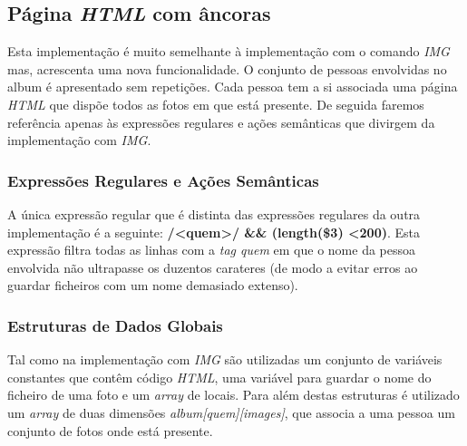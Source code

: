 \documentclass{article}
\begin{document}
\subsection{Página \emph{HTML} com âncoras}
Esta implementação é muito semelhante à implementação com o comando \emph{IMG} mas, acrescenta uma nova funcionalidade. O conjunto de pessoas envolvidas no album é apresentado sem repetições. Cada pessoa tem a si associada uma página \emph{HTML} que dispõe todos as fotos em que está presente. De seguida faremos referência apenas às expressões regulares e ações semânticas que divirgem da implementação com \emph{IMG}.


\subsubsection{Expressões Regulares e Ações Semânticas}
A única expressão regular que é distinta das expressões regulares da outra implementação é a seguinte: \textbf{/\textless quem\textgreater/ && (length(\$3) \textless 200)}. Esta expressão filtra todas as linhas com a \emph{tag quem} em que o nome da pessoa envolvida não ultrapasse os duzentos carateres (de modo a evitar erros ao guardar ficheiros com um nome demasiado extenso).  



\subsubsection{Estruturas de Dados Globais}
Tal como na implementação com \emph{IMG} são utilizadas um conjunto de variáveis constantes que contêm código \emph{HTML}, uma variável para guardar o nome do ficheiro de uma foto e um \emph{array} de locais. Para além destas estruturas é utilizado um \emph{array} de duas dimensões \emph{album[quem][images]}, que associa a uma pessoa um conjunto de fotos onde está presente.

\newpage
\end{document}
